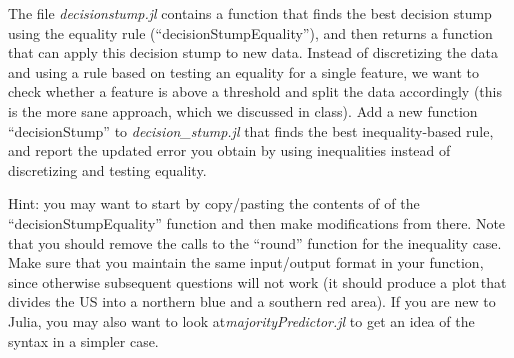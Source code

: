 \documentclass{article}
\def\blu#1{{\color{blu}#1}}
\begin{document}
The file \emph{decisionstump.jl} contains a function  that finds the best decision stump using the equality rule (``decisionStumpEquality''), and then returns a function that can apply this decision stump to new data. Instead of discretizing the data and using a rule based on testing an equality for a single feature, we want to check whether a feature is above a threshold and split the data accordingly (this is the more sane approach, which we discussed in class). \blu{Add a new function ``decisionStump'' to \emph{decision\_stump.jl} that finds the best inequality-based rule, and report the updated error you obtain by using inequalities instead of discretizing and testing equality.}

Hint: you may want to start by copy/pasting the contents of of the ``decisionStumpEquality'' function and then make modifications from there. Note that you should remove the calls to the ``round'' function for the inequality case.  Make sure that you maintain the same input/output format in your function, since otherwise subsequent questions will not work (it should produce a plot that divides the US into a northern blue and a southern red area).
If you are new to Julia, you may also want to look at\emph{majorityPredictor.jl} to get an idea of the syntax in  a simpler case.
\end{document}
